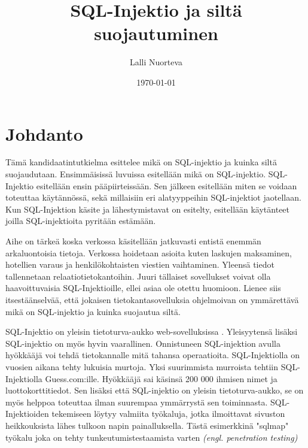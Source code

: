 \documentclass[finnish]{tktltiki2}
\title{SQL-Injektio ja siltä suojautuminen}
\author{Lalli Nuorteva}
\date{\today}
\theoremstyle{definition}
\theoremstyle{remark}
\begin{document}
	
	\frontmatter      %
	
	\maketitle        %
	
	\tableofcontents  %
	
	
	\mainmatter       %
	
	\section{Johdanto}
	Tämä kandidaatintutkielma esittelee mikä on SQL-injektio ja kuinka siltä suojaudutaan. Ensimmäisissä luvuissa esitellään mikä on SQL-injektio. SQL-Injektio esitellään ensin pääpiirteissään. Sen jälkeen esitellään miten se voidaan toteuttaa käytännössä, sekä millaisiin eri alatyyppeihin SQL-injektiot jaotellaan. Kun SQL-Injektion käsite ja lähestymistavat on esitelty, esitellään käytänteet joilla SQL-injektioita pyritään estämään.
	
	Aihe on tärkeä koska verkossa käsitellään jatkuvasti entistä enemmän arkaluontoisia tietoja. Verkossa hoidetaan asioita kuten laskujen maksaminen, hotellien varaus ja henkilökohtaisten viestien vaihtaminen. Yleensä tiedot tallennetaan relaatiotietokantoihin. Juuri tällaiset sovellukset voivat olla haavoittuvaisia SQL-Injektioille, ellei asiaa ole otettu huomioon. Lienee siis itsestäänselvää, että jokaisen tietokantasovelluksia ohjelmoivan on ymmärettävä mikä on SQL-injektio ja kuinka suojautua siltä.
	
	SQL-Injektio on yleisin tietoturva-aukko web-sovelluksissa \cite{detection}. Yleisyytensä lisäksi SQL-injektio on myös hyvin vaarallinen. Onnistuneen SQL-injektion avulla hyökkääjä voi tehdä tietokannalle mitä tahansa operaatioita. SQL-Injektiolla on vuosien aikana tehty lukuisia murtoja. Yksi suurimmista murroista tehtiin SQL-Injektiolla Guess.com:ille. Hyökkääjä sai käsinsä 200 000 ihmisen nimet ja luottokorttitiedot. Sen lisäksi että SQL-injektio on yleisin tietoturva-aukko, se on myös helppoa toteuttaa ilman suurempaa ymmärrystä sen toiminnasta. SQL-Injektioiden tekemiseen löytyy valmiita työkaluja, jotka ilmoittavat sivuston heikkouksista lähes tulkoon napin painalluksella. Tästä esimerkkinä "sqlmap" työkalu joka on tehty tunkeutumistestaamista varten \textit{(engl. penetration testing)}
	
\end{document}
